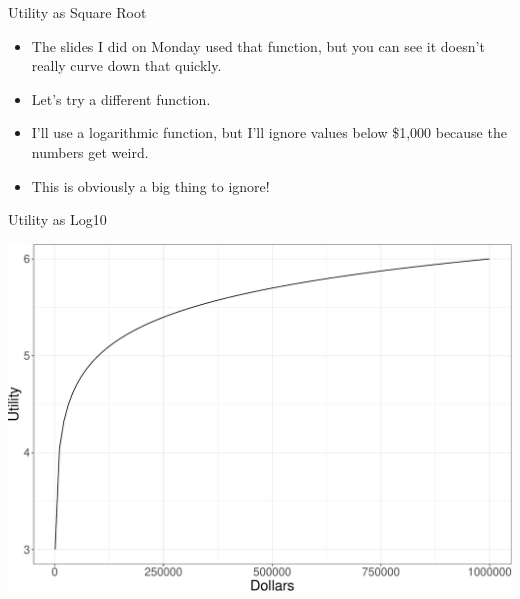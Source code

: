 \documentclass[
  ignorenonframetext,
]{beamer}
\providecommand{\tightlist}{%
  \setlength{\itemsep}{0pt}\setlength{\parskip}{0pt}}
\renewcommand{\,}{\text{, }}
\begin{document}
\begin{frame}{Utility as Square Root}
\protect\hypertarget{utility-as-square-root-1}{}

\begin{itemize}
\tightlist
\item
  The slides I did on Monday used that function, but you can see it
  doesn't really curve down that quickly.
\item
  Let's try a different function.
\item
  I'll use a logarithmic function, but I'll ignore values below \$1,000
  because the numbers get weird.
\item
  This is obviously a big thing to ignore!
\end{itemize}

\end{frame}

\begin{frame}{Utility as Log10}
\protect\hypertarget{utility-as-log10}{}

\begin{center}


\includegraphics[width=0.9\linewidth]{Lecture_3_4_all_files/figure-beamer/unnamed-chunk-2-1} 

\end{center}

\end{frame}
\end{document}
